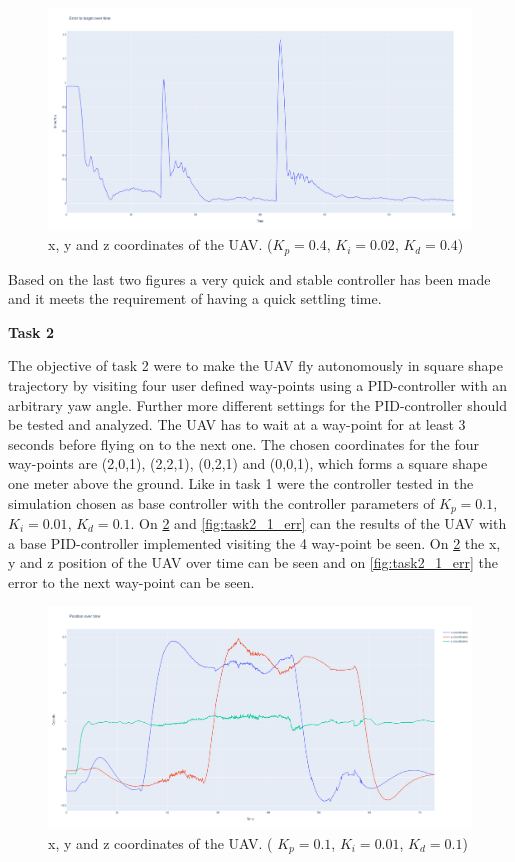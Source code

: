 \documentclass[conference]{IEEEtran}
\begin{document}
\begin{figure}[hbtp]
	\centering
	\includegraphics[width=1.0\linewidth]{images/task1_9_err.png}
	\caption{x, y and z coordinates of the UAV. ($K_p = 0.4$, $K_i = 0.02$, $K_d = 0.4$)}
	\label{fig:task1_9_err}
\end{figure}

Based on the last two figures a very quick and stable controller has been made and it meets the requirement of having a quick settling time.

\textbf{Task 2}

The objective of task 2 were to make the UAV fly autonomously in square shape trajectory by visiting four user defined way-points using a PID-controller with an arbitrary yaw angle. Further more different settings for the PID-controller should be tested and analyzed. The UAV has to wait at a way-point for at least 3 seconds before flying on to the next one. 
The chosen coordinates for the four way-points are (2,0,1), (2,2,1), (0,2,1) and (0,0,1), which forms a square shape one meter above the ground. Like in task 1 were the controller tested in the simulation chosen as base controller with the controller parameters of $K_p = 0.1$, $K_i = 0.01$, $K_d = 0.1$. On \cref{fig:task2_1_pos} and \cref{fig:task2_1_err} can the results of the UAV with a base PID-controller implemented visiting the 4 way-point be seen.
On \cref{fig:task2_1_pos} the x, y and z position of the UAV over time can be seen and on \cref{fig:task2_1_err} the error to the next way-point can be seen. 


\begin{figure}[hbtp]
	\centering
	\includegraphics[width=1.0\linewidth]{images/task2_1_pos.png}
	\caption{x, y and z coordinates of the UAV. ( $K_p = 0.1$, $K_i = 0.01$, $K_d = 0.1$)}
	\label{fig:task2_1_pos}
\end{figure}
\end{document}
